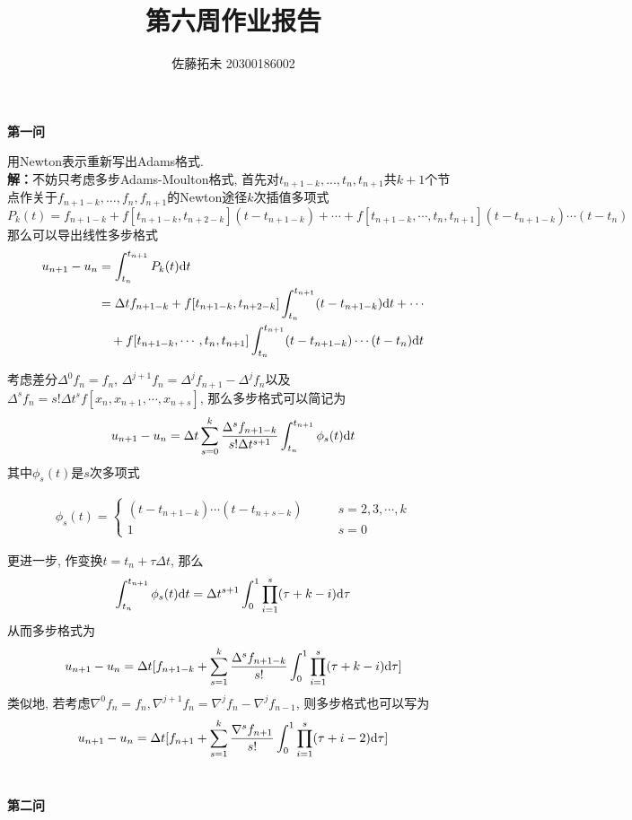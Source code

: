 \documentclass[12pt]{article}
\title{第六周作业报告}
\author{佐藤拓未 20300186002}
\date{}
\begin{document}
	
	\maketitle
	
	\begin{center}
		\textbf{第一问}
	\end{center}



\noindent 用Newton表示重新写出Adams格式.\\


\noindent \textbf{解：}不妨只考虑多步Adams-Moulton格式, 首先对$t_{n+1-k}, ..., t_n, t_{n+1}$共$k+1$个节点作关于$f_{n+1-k}, ..., f_n, f_{n+1}$的Newton途径$k$次插值多项式
$$P_k(t)=f_{n+1-k}+   f[t_{n+1-k},t_{n+2-k}](t-t_{n+1-k})+\cdots+f[t_{n+1-k},\cdots,t_n,t_{n+1}](t-t_{n+1-k})\cdots(t-t_n)$$
那么可以导出线性多步格式
\begin{align*}
	u_{n+1}-u_n&=\int_{t_n}^{t_{n+1}}P_k(t){\rm d} t\\
	&=\Delta{t}f_{n+1-k}+f[t_{n+1-k},t_{n+2-k}]\int_{t_n}^{t_{n+1}}(t-t_{n+1-k}){\rm d}t+\cdots\\
	&\quad+f[t_{n+1-k},\cdots,t_n,t_{n+1}]\int_{t_n}^{t_{n+1}}(t-t_{n+1-k})\cdots(t-t_n){\rm d} t
\end{align*}

\noindent 考虑差分$\Delta^0f_{n}=f_{n}$, $\Delta^{j+1}f_n=\Delta^jf_{n+1}-\Delta^jf_{n}$以及$\Delta^sf_n=s!\Delta{t}^sf[x_n,x_{n+1},\cdots,x_{n+s}]$, 那么多步格式可以简记为
$$u_{n+1}-u_n=\Delta{t}\sum_{s=0}^{k}\frac{\Delta^s f_{n+1-k}}{s!\Delta{t}^{s+1}}\int_{t_n}^{t_{n+1}}\phi_s(t){\rm d}t$$
\noindent 其中$\phi_s(t)$是$s$次多项式

\begin{align*}
	\phi_s(t)=\begin{cases}
		(t-t_{n+1-k})\cdots(t-t_{n+s-k}) \quad \quad & s=2,3,\cdots,k\\
		1 &s=0
	\end{cases}
\end{align*}

\noindent 更进一步, 作变换$t=t_n+\tau \Delta{t}$, 那么$$\int_{t_n}^{t_{n+1}}\phi_s(t){\rm d}t=\Delta{t}^{s+1}\int_{0}^{1}\prod_{i=1}^{s}(\tau+k-i){\rm d}\tau$$
\noindent 从而多步格式为$$u_{n+1}-u_n=\Delta{t}[f_{n+1-k}+\sum_{s=1}^{k}\frac{\Delta^s f_{n+1-k}}{s!}\int_{0}^{1}\prod_{i=1}^{s}(\tau+k-i){\rm d}\tau]$$
\noindent 类似地, 若考虑$\nabla^0f_n=f_n, \nabla^{j+1}f_n=\nabla^jf_n-\nabla^jf_{n-1}$, 则多步格式也可以写为
$$u_{n+1}-u_n=\Delta{t}[f_{n+1}+   \sum_{s=1}^{k}\frac{\nabla^sf_{n+1}}{s!}\int_{0}^{1}\prod_{i=1}^{s}(\tau+i-2){\rm d}\tau]$$
\\
\begin{center}
	\textbf{第二问}
\end{center}
	
\end{document}

